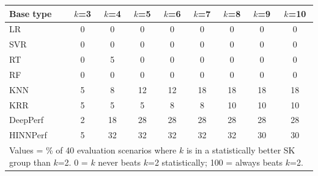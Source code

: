 \begin{tabular}{lcccccccc}
\toprule
Base type & $k$=3 & $k$=4 & $k$=5 & $k$=6 & $k$=7 & $k$=8 & $k$=9 & $k$=10 \\
\midrule
LR & 0 & 0 & 0 & 0 & 0 & 0 & 0 & 0 \\
SVR & 0 & 0 & 0 & 0 & 0 & 0 & 0 & 0 \\
RT & 0 & 5 & 0 & 0 & 0 & 0 & 0 & 0 \\
RF & 0 & 0 & 0 & 0 & 0 & 0 & 0 & 0 \\
KNN & 5 & 8 & 12 & 12 & 18 & 18 & 18 & 18 \\
KRR & 5 & 5 & 5 & 8 & 8 & 10 & 10 & 10 \\
DeepPerf & 2 & 18 & 28 & 28 & 28 & 28 & 28 & 28 \\
HINNPerf & 5 & 32 & 32 & 32 & 32 & 32 & 30 & 30 \\
\bottomrule
\multicolumn{9}{l}{\footnotesize Values = \% of 40 evaluation scenarios where $k$ is in a statistically better SK group than $k$=2. 0 = $k$ never beats $k$=2 statistically; 100 = always beats $k$=2.}} \\
\end{tabular}
